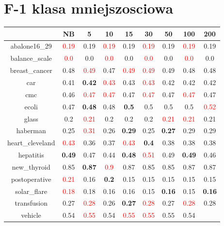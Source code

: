 \documentclass{article}%
\begin{document}
\section*{F{-}1 klasa mniejszosciowa}%
\begin{tabular}{c|cccccccc}%
\hline%
&NB&5&10&15&30&50&100&200\\%
\hline%
abalone16\_29&\textcolor{red}{ 
0.19
}&0.19&\textcolor{red}{ 
0.19
}&0.19&\textcolor{red}{ 
0.19
}&0.19&\textcolor{red}{ 
0.19
}&0.19\\%
\hline%
balance\_scale&\textcolor{red}{ 
0.0
}&0.0&\textcolor{red}{ 
0.0
}&0.0&\textcolor{red}{ 
0.0
}&0.0&\textcolor{red}{ 
0.0
}&0.0\\%
\hline%
breast\_cancer&0.48&\textcolor{red}{ 
0.49
}&0.47&\textcolor{red}{ 
0.49
}&\textcolor{red}{ 
0.49
}&0.49&0.48&0.48\\%
\hline%
car&0.41&\textbf{0.42}&\textcolor{red}{ 
0.43
}&0.43&\textcolor{red}{ 
0.43
}&0.42&0.42&0.42\\%
\hline%
cmc&0.46&\textcolor{red}{ 
0.47
}&\textcolor{red}{ 
0.47
}&0.47&\textcolor{red}{ 
0.47
}&0.47&\textcolor{red}{ 
0.47
}&0.47\\%
\hline%
ecoli&0.47&\textbf{0.48}&0.48&\textbf{0.5}&0.5&0.5&0.5&\textcolor{red}{ 
0.52
}\\%
\hline%
glass&0.2&\textcolor{red}{ 
0.21
}&0.2&0.2&0.2&\textcolor{red}{ 
0.21
}&\textcolor{red}{ 
0.21
}&0.21\\%
\hline%
haberman&0.25&\textcolor{red}{ 
0.31
}&0.26&\textbf{0.29}&0.25&\textbf{0.27}&0.29&0.29\\%
\hline%
heart\_cleveland&\textcolor{red}{ 
0.43
}&0.36&0.37&\textcolor{red}{ 
0.43
}&\textbf{0.4}&0.38&0.38&0.38\\%
\hline%
hepatitis&\textbf{0.49}&0.47&0.44&\textbf{0.48}&\textcolor{red}{ 
0.51
}&0.49&\textbf{0.49}&0.46\\%
\hline%
new\_thyroid&0.85&\textbf{0.87}&\textcolor{red}{ 
0.9
}&0.87&0.85&0.85&0.87&0.87\\%
\hline%
postoperative&\textcolor{red}{ 
0.21
}&0.16&\textbf{0.2}&0.15&0.15&0.15&0.15&0.15\\%
\hline%
solar\_flare&\textcolor{red}{ 
0.18
}&0.18&0.16&0.16&0.15&\textbf{0.16}&0.15&\textbf{0.16}\\%
\hline%
transfusion&0.27&\textcolor{red}{ 
0.28
}&0.26&\textbf{0.27}&\textcolor{red}{ 
0.28
}&0.27&\textcolor{red}{ 
0.28
}&0.28\\%
\hline%
vehicle&0.54&\textcolor{red}{ 
0.55
}&0.54&\textcolor{red}{ 
0.55
}&\textcolor{red}{ 
0.55
}&0.55&0.54&\textcolor{red}{ 
}
\end{tabular}
\end{document}
